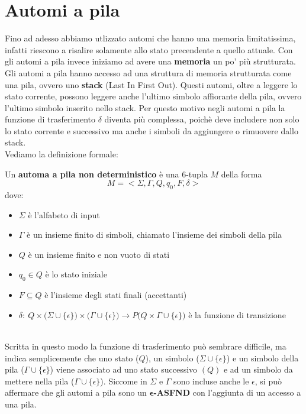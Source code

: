 \section{Automi a pila}
Fino ad adesso abbiamo utlizzato automi che hanno una memoria limitatissima, infatti riescono a risalire solamente allo stato precendente a quello attuale. Con gli automi a pila invece iniziamo ad avere una \textbf{memoria} un po' più strutturata.
Gli automi a pila hanno accesso ad una struttura di memoria strutturata come una pila, ovvero uno \textbf{stack} (Last In First Out).
Questi automi, oltre a leggere lo stato corrente, possono leggere anche l'ultimo simbolo affiorante della pila, ovvero l'ultimo simbolo inserito nello stack. 
Per questo motivo negli automi a pila la funzione di trasferimento $\delta$ diventa più complessa, poichè deve includere non solo lo stato corrente e successivo ma anche i simboli da aggiungere o rimuovere dallo stack.\smallskip\\
Vediamo la definizione formale:\smallskip\\
\colorbox{SALZO}{\parbox{\dimexpr\linewidth-2\fboxsep}{\begin{definition}
   Un \textbf{automa a pila non deterministico} è una 6-tupla $M$ della forma 
   \[M=<\Sigma,\Gamma ,Q,q_0,F,\delta>\] 
   dove:
   \begin{itemize}[label = --]
    \item $\Sigma$ è l'alfabeto di input
    \item $\Gamma$ è un insieme finito di simboli, chiamato l'insieme dei simboli della pila 
    \item $Q$ è un insieme finito e non vuoto di stati
    \item $q_0 \in Q$ è lo stato iniziale
    \item $F \subseteq Q$ è l'insieme degli stati finali (accettanti)
    \item $\delta:\  Q \times \Big(  \Sigma \cup \{\epsilon\}  \Big) \times \Big(\Gamma \cup \{\epsilon\} \Big) \longrightarrow  P\Big(  Q \times \Gamma \cup \{\epsilon \}   \Big)   $ è la funzione di transizione
   \end{itemize}
\end{definition}}}\smallskip\\
Scritta in questo modo la funzione di trasferimento può sembrare difficile, ma indica semplicemente che uno stato ($Q$), un simbolo ($\Sigma \cup \{\epsilon\}$) e un simbolo della pila ($\Gamma \cup \{\epsilon\}$) viene associato
ad uno stato successivo $(Q)$ e ad un simbolo da mettere nella pila ($\Gamma \cup \{\epsilon\}$). Siccome in $\Sigma$ e $\Gamma$ sono incluse anche le $\epsilon$, si può affermare che gli automi a pila sono un $\bm{\epsilon}$\textbf{-ASFND}
con l'aggiunta di un accesso a una pila.


